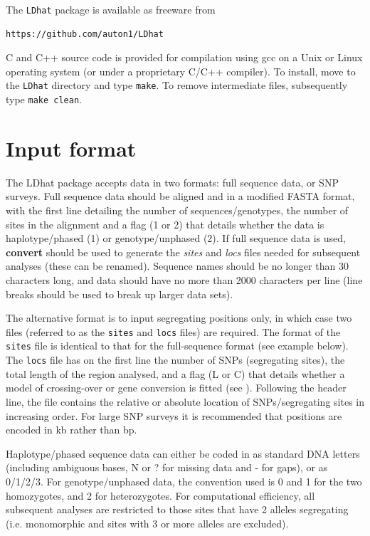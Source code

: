\documentclass[a4paper,10pt,fullpage]{article}
\begin{document}
The \verb+LDhat+ package is available as freeware from
\begin{verbatim}
https://github.com/auton1/LDhat
\end{verbatim}
\noindent C and C++ source code is provided for compilation using gcc on a Unix or Linux
operating system (or under a proprietary C/C++ compiler).  To install, move to the \verb+LDhat+ directory and type \verb+make+.  To remove intermediate files, subsequently type \verb+make clean+.


\section{Input format}
The LDhat package accepts data in two formats: full sequence data,
or SNP surveys.  Full sequence data should be aligned and in a
modified FASTA format, with the first line detailing the number of
sequences/genotypes, the number of sites in the alignment and a
flag (1 or 2) that details whether the data is haplotype/phased
(1) or genotype/unphased (2). If full sequence data is used, {\bf
convert} should be used to generate the {\it sites} and {\it locs}
files needed for subsequent analyses (these can be renamed).
Sequence names should be no longer than 30 characters long, and
data should have no more than 2000 characters per line (line
breaks should be used to break up larger data sets).

The alternative format is to input segregating positions only, in
which case two files (referred to as the {\verb+sites+} and {\verb+locs+} files) are required.  The format of the {\verb+sites+} file is
identical to that for the full-sequence format (see example
below).  The {\verb+locs+} file has on the first line the number of
SNPs (segregating sites), the total length of the region analysed,
and a flag (L or C) that details whether a model of crossing-over
or gene conversion is fitted (see \cite{McVeanetal02}).  Following
the header line, the file contains the relative or absolute
location of SNPs/segregating sites in increasing order.  For large
SNP surveys it is recommended that positions are encoded in kb
rather than bp.

Haplotype/phased sequence data can either be coded in as standard
DNA letters (including ambiguous bases, N or ? for missing data
and - for gaps), or as 0/1/2/3.  For genotype/unphased data, the
convention used is 0 and 1 for the two homozygotes, and 2 for
heterozygotes.  For computational efficiency, all subsequent
analyses are restricted to those sites that have 2 alleles
segregating (i.e. monomorphic and sites with 3 or more alleles are
excluded). \\\\
\end{document}

